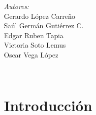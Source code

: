 \documentclass[12pt]{article}
\makeatletter
\let\theauthor\@author
\makeatother
\begin{document}
\begin{titlepage}
\begin{minipage}{0.4\textwidth}
    \begin{flushright} \large
      \emph{Autores:} \\
      Gerardo López Carreño \\
      Saúl Germán Gutiérrez C. \\
      Edgar Ruben Tapia \\
      Victoria Soto Lemus \\
      Oscar Vega López\\
    \end{flushright}
    
  \end{minipage}\\[2 cm]
     
\end{titlepage}


\pagebreak

 
\section{Introducción}


\printbibliography
\end{document}
